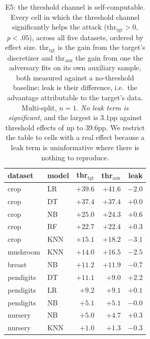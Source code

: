 \documentclass[sigconf,anonymous,review]{acmart}
\begin{document}
\begin{table}[t]
\centering
\caption{E5: the threshold channel is self-computable. Every cell in which the threshold channel
significantly helps the attack ($\text{thr}_{\text{tgt}}>0$, $p{<}.05$), across all five datasets,
ordered by effect size. $\text{thr}_{\text{tgt}}$ is the gain from the target's discretizer and
$\text{thr}_{\text{aux}}$ the gain from one the adversary fits on its own auxiliary sample, both
measured against a no-threshold baseline; $\text{leak}$ is their difference, i.e.\ the advantage
attributable to the target's data. Multi-split, $n{=}1$. \emph{No leak term is significant}, and the
largest is $3.1$pp against threshold effects of up to $39.6$pp. We restrict the table to cells with a
real effect because a leak term is uninformative where there is nothing to reproduce.}
\label{tab:auxdisc}
\begin{tabular}{llrrr}
\toprule
dataset & model & thr$_{\text{tgt}}$ & thr$_{\text{aux}}$ & leak \\
\midrule
crop      & LR  & $+39.6$ & $+41.6$ & $-2.0$ \\
crop      & DT  & $+37.4$ & $+37.4$ & $+0.0$ \\
crop      & NB  & $+25.0$ & $+24.3$ & $+0.6$ \\
crop      & RF  & $+22.7$ & $+22.4$ & $+0.3$ \\
crop      & KNN & $+15.1$ & $+18.2$ & $-3.1$ \\
mushroom  & KNN & $+14.0$ & $+16.5$ & $-2.5$ \\
breast    & NB  & $+11.2$ & $+11.9$ & $-0.7$ \\
pendigits & DT  & $+11.1$ & $+9.0$  & $+2.2$ \\
pendigits & LR  & $+9.2$  & $+9.1$  & $+0.1$ \\
pendigits & NB  & $+5.1$  & $+5.1$  & $-0.0$ \\
nursery   & NB  & $+5.0$  & $+4.7$  & $+0.3$ \\
nursery   & KNN & $+1.0$  & $+1.3$  & $-0.3$ \\
\bottomrule
\end{tabular}
\end{table}
\end{document}
